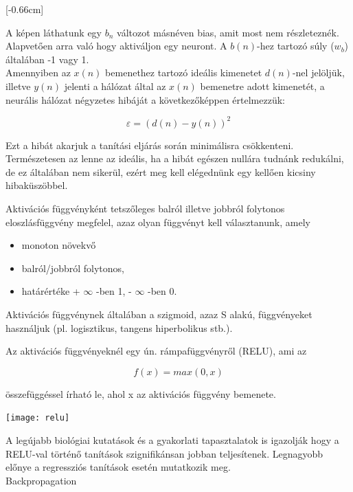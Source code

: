 [-0.66cm]

A képen láthatunk egy \(b_n\) változot másnéven bias, amit most nem részleteznék. Alapvetően arra való hogy aktiváljon egy neuront. A \(b(n)\)-hez tartozó súly (\(w_b\)) általában -1 vagy 1.\\

Amennyiben az \(x(n)\) bemenethez tartozó ideális kimenetet \(d(n)\)-nel jelöljük, illetve \(y(n)\) jelenti a hálózat által az \(x(n)\) bemenetre adott kimenetét, a neurális hálózat négyzetes hibáját a következőképpen értelmezzük: 

\[ \varepsilon = (d(n) - y(n))^2\]

Ezt a hibát akarjuk a tanítási eljárás során minimálisra csökkenteni. Természetesen az lenne az ideális, ha a hibát egészen nullára tudnánk redukálni, de ez általában nem sikerül, ezért meg kell elégednünk egy kellően kicsiny hibaküszöbbel.

Aktivációs függvényként tetszőleges balról illetve jobbról folytonos eloszlásfüggvény megfelel, azaz olyan függvényt kell választanunk, amely

\begin{itemize}
\item monoton növekvő
\item balról/jobbról folytonos,
\item határértéke + $\infty$ -ben 1, - $\infty$ -ben 0.
\end{itemize}

Aktivációs függvénynek általában a szigmoid, azaz S alakú, függvényeket használjuk (pl. logisztikus, tangens hiperbolikus stb.).

Az aktivációs függvényeknél egy ún. rámpafüggvényről (RELU), ami az

\[ f(x) = max(0,x) \]

összefüggéssel írható le, ahol x az aktivációs függvény bemenete.

\begin{center}
\texttt{[image: relu]}
\end{center}

A legújabb biológiai kutatások és a gyakorlati tapasztalatok is igazolják hogy a RELU-val történő tanítások szignifikánsan jobban teljesítenek. Legnagyobb előnye a regressziós tanítások esetén mutatkozik meg.\\

{\Large Backpropagation}\\

